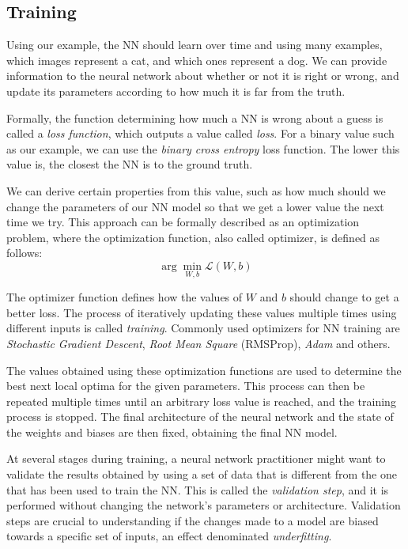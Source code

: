 \subsection{Training}

Using our example, the NN should learn over time and using many examples, which images represent a cat, and which ones represent a dog.
We can provide information to the neural network about whether or not it is right or wrong, and update its parameters according to how much it is far from the truth.

Formally, the function determining how much a NN is wrong about a guess is called a \textit{loss function}, which outputs a value called \textit{loss}.
For a binary value such as our example, we can use the \textit{binary cross entropy} loss function.
The lower this value is, the closest the NN is to the ground truth.

We can derive certain properties from this value, such as how much should we change the parameters of our NN model so that we get a lower value the next time we try.
This approach can be formally described as an optimization problem, where the optimization function, also called optimizer, is defined as follows:
\begin{equation}
    \arg \min_{W, b} \mathcal{L} (W, b)
\end{equation}

The optimizer function defines how the values of $W$ and $b$ should change to get a better loss.
The process of iteratively updating these values multiple times using different inputs is called \textit{training}.
Commonly used optimizers for NN training are \textit{Stochastic Gradient Descent}, \textit{Root Mean Square} (RMSProp), \textit{Adam} and others.

The values obtained using these optimization functions are used to determine the best next local optima for the given parameters.
This process can then be repeated multiple times until an arbitrary loss value is reached, and the training process is stopped.
The final architecture of the neural network and the state of the weights and biases are then fixed, obtaining the final NN model.

At several stages during training, a neural network practitioner might want to validate the results obtained by using a set of data that is different from the one that has been used to train the NN.
This is called the \textit{validation step}, and it is performed without changing the network's parameters or architecture.
Validation steps are crucial to understanding if the changes made to a model are biased towards a specific set of inputs, an effect denominated \textit{underfitting}.

